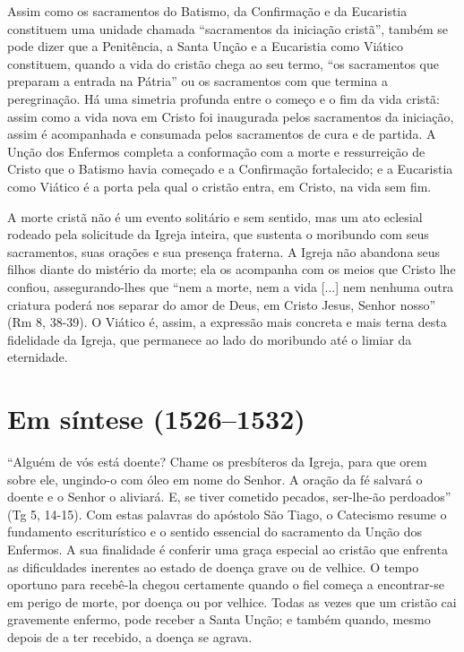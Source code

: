 Assim como os sacramentos do Batismo, da Confirmação e da Eucaristia constituem uma unidade chamada ``sacramentos da iniciação cristã'', também se pode dizer que a Penitência, a Santa Unção e a Eucaristia como Viático constituem, quando a vida do cristão chega ao seu termo, ``os sacramentos que preparam a entrada na Pátria'' ou os sacramentos com que termina a peregrinação. Há uma simetria profunda entre o começo e o fim da vida cristã: assim como a vida nova em Cristo foi inaugurada pelos sacramentos da iniciação, assim é acompanhada e consumada pelos sacramentos de cura e de partida. A Unção dos Enfermos completa a conformação com a morte e ressurreição de Cristo que o Batismo havia começado e a Confirmação fortalecido; e a Eucaristia como Viático é a porta pela qual o cristão entra, em Cristo, na vida sem fim.

A morte cristã não é um evento solitário e sem sentido, mas um ato eclesial rodeado pela solicitude da Igreja inteira, que sustenta o moribundo com seus sacramentos, suas orações e sua presença fraterna. A Igreja não abandona seus filhos diante do mistério da morte; ela os acompanha com os meios que Cristo lhe confiou, assegurando-lhes que ``nem a morte, nem a vida [...] nem nenhuma outra criatura poderá nos separar do amor de Deus, em Cristo Jesus, Senhor nosso'' (Rm 8, 38-39). O Viático é, assim, a expressão mais concreta e mais terna desta fidelidade da Igreja, que permanece ao lado do moribundo até o limiar da eternidade.

\section{Em síntese (1526--1532)}

``Alguém de vós está doente? Chame os presbíteros da Igreja, para que orem sobre ele, ungindo-o com óleo em nome do Senhor. A oração da fé salvará o doente e o Senhor o aliviará. E, se tiver cometido pecados, ser-lhe-ão perdoados'' (Tg 5, 14-15). Com estas palavras do apóstolo São Tiago, o Catecismo resume o fundamento escriturístico e o sentido essencial do sacramento da Unção dos Enfermos. A sua finalidade é conferir uma graça especial ao cristão que enfrenta as dificuldades inerentes ao estado de doença grave ou de velhice. O tempo oportuno para recebê-la chegou certamente quando o fiel começa a encontrar-se em perigo de morte, por doença ou por velhice. Todas as vezes que um cristão cai gravemente enfermo, pode receber a Santa Unção; e também quando, mesmo depois de a ter recebido, a doença se agrava.

